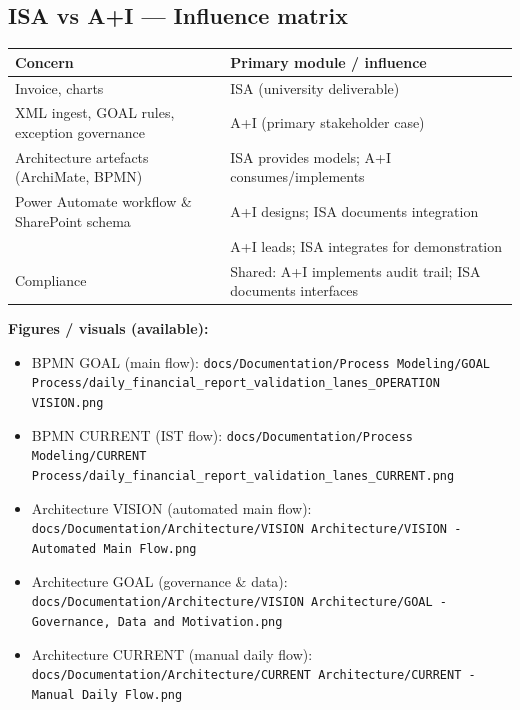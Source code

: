 \documentclass[11pt,a4paper]{article}
\begin{document}
\subsection*{ISA vs A+I — Influence matrix}
\begin{center}
\begin{tabular}{@{}p{}p{}@{}}
\toprule
\textbf{Concern} & \textbf{Primary module / influence} \\
\midrule
Invoice, charts & ISA (university deliverable) \\
XML ingest, GOAL rules, exception governance & A+I (primary stakeholder case) \\
Architecture artefacts (ArchiMate, BPMN) & ISA provides models; A+I consumes/implements \\
Power Automate workflow \& SharePoint schema & A+I designs; ISA documents integration \\
 & A+I leads; ISA integrates for demonstration \\
Compliance & Shared: A+I implements audit trail; ISA documents interfaces \\
\bottomrule
\end{tabular}
\end{center}

\vspace{0.8em}
\begin{tcolorbox}[colback=ISAAIGreen!5,colframe=ISAAIGreen,arc=2pt]
\textbf{Figures / visuals (available):}
\begin{itemize}[leftmargin=*, noitemsep]
  \item BPMN GOAL (main flow): \texttt{docs/Documentation/Process Modeling/GOAL Process/daily\_financial\_report\_validation\_lanes\_OPERATION VISION.png}
  \item BPMN CURRENT (IST flow): \texttt{docs/Documentation/Process Modeling/CURRENT Process/daily\_financial\_report\_validation\_lanes\_CURRENT.png}
  \item Architecture VISION (automated main flow): \texttt{docs/Documentation/Architecture/VISION Architecture/VISION - Automated Main Flow.png}
  \item Architecture GOAL (governance \& data): \texttt{docs/Documentation/Architecture/VISION Architecture/GOAL - Governance, Data and Motivation.png}
  \item Architecture CURRENT (manual daily flow): \texttt{docs/Documentation/Architecture/CURRENT Architecture/CURRENT - Manual Daily Flow.png}
\end{itemize}
\end{tcolorbox}
\end{document}
